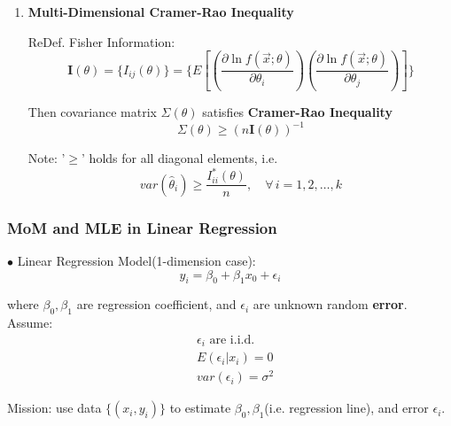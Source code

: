 \begin{enumerate}
\item \textbf{Multi-Dimensional Cramer-Rao Inequality}

    ReDef. Fisher Information:
    \[
        \mathbf{I}(\theta)=\{I_{ij}(\theta)\}=\{E\left[\left(\frac{\partial\ln f(\vec{x};\theta)}{\partial\theta_i}\right)\left(\frac{\partial\ln f(\vec{x};\theta)}{\partial\theta_j}\right)\right]\}  
    \]

    Then covariance matrix $\Sigma(\theta)$ satisfies \textbf{Cramer-Rao Inequality}
    \[
        \Sigma(\theta)\geq (n\mathbf{I}(\theta))^{-1}
    \]

    Note: '$\geq$' holds for all diagonal elements, i.e.
\[
    var(\hat{\theta}_i)\geq \frac{I^*_{ii}(\theta)}{n},\quad \forall\,i=1,2,\ldots,k  
\]


    
\end{enumerate}

\subsubsection{MoM and MLE in Linear Regression}\label{SubSectionMoM_MLE_LinearRegression}
    $\bullet$ Linear Regression Model(1-dimension case):
    \[
        y_i=\beta_0+\beta_1x_0+\epsilon_i    
    \]

    where $\beta_0,\beta_1$ are regression coefficient, and $\epsilon_i$ are unknown random \textbf{error}. Assume:
    \begin{align*}
        &\epsilon_i\text{ are i.i.d.}\\
        &E(\epsilon_i|x_i)=0\\
        &var(\epsilon_i)=\sigma^2
    \end{align*}

    Mission: use data $\{(x_i,y_i)\}$ to estimate $\beta_0,\beta_1$(i.e. regression line), and error $\epsilon_i$.

